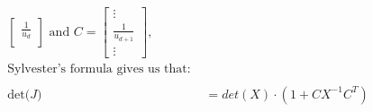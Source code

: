 \documentclass[paper=a4, fontsize=11pt]{scrartcl}
\begin{document}
\begin{enumerate}[1.]
\begin{enumerate}[1]
\begin{align*}
\begin{bmatrix}
              \frac{1}{u_d} \\
            \end{bmatrix}
            \mbox{ and } C =
            \begin{bmatrix}
              \vdots \\
              \frac{1}{u_{d+1}} \\
              \vdots
            \end{bmatrix}, \\
            \text{Sylvester's formula gives us that: }
          \\ \\ \mbox{det(} J \mbox{)} &=
              det(X) \cdot (1 + CX^{-1}C^{T})
          \end{align*}
    \end{enumerate}
\end{enumerate}
\end{document}
